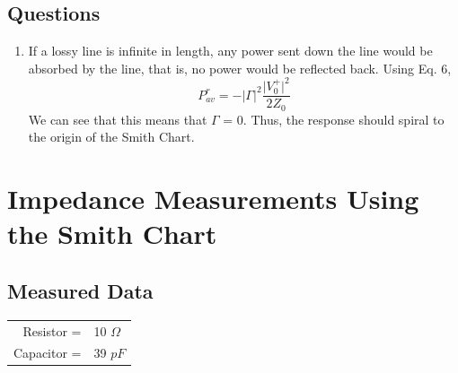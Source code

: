\documentclass{article}
\begin{document}
\subsection{Questions}
\begin{enumerate}
	\item If a lossy line is infinite in length, any power sent down the line would be absorbed by the line, that is, no power would be reflected back. Using Eq. 6, 
	\begin{equation}
		P_{av}^r = -\vert\Gamma\vert^2 \frac{\vert V_0^+\vert^2}{2Z_0}
	\end{equation}
We can see that this means that $\Gamma$ = 0. Thus, the response should spiral to the origin of the Smith Chart.
\end{enumerate}


\section{Impedance Measurements Using the Smith Chart}

\subsection{Measured Data}
\begin{table}[H]
\centering
	\begin{tabular}{rl}
	Resistor =   & 10 $\Omega$  \\
	Capacitor =  & 39 $pF$      
	\end{tabular}
\end{table}
\end{document}
